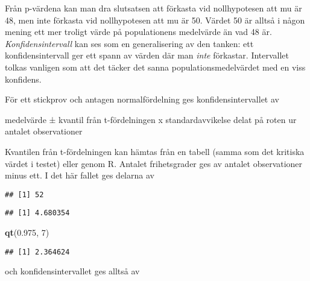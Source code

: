 \documentclass[
]{book}
\newenvironment{Shaded}{\begin{snugshade}}{\end{snugshade}}
\newcommand{\DecValTok}[1]{\textcolor[rgb]{0.00,0.00,0.81}{#1}}
\newcommand{\FloatTok}[1]{\textcolor[rgb]{0.00,0.00,0.81}{#1}}
\newcommand{\FunctionTok}[1]{\textcolor[rgb]{0.13,0.29,0.53}{\textbf{#1}}}
\newcommand{\NormalTok}[1]{#1}
\newcommand{\SpecialCharTok}[1]{\textcolor[rgb]{0.81,0.36,0.00}{\textbf{#1}}}
\theoremstyle{definition}
\theoremstyle{definition}
\theoremstyle{definition}
\theoremstyle{definition}
\theoremstyle{remark}
\begin{document}
Från p-värdena kan man dra slutsatsen att förkasta vid nollhypotesen att mu är 48, men inte förkasta vid nollhypotesen att mu är 50. Värdet 50 är alltså i någon mening ett mer troligt värde på populationens medelvärde än vad 48 är. \emph{Konfidensintervall} kan ses som en generalisering av den tanken: ett konfidensintervall ger ett spann av värden där man \emph{inte} förkastar. Intervallet tolkas vanligen som att det täcker det sanna populationsmedelvärdet med en viss konfidens.

För ett stickprov och antagen normalfördelning ges konfidensintervallet av

medelvärde ± kvantil från t-fördelningen x standardavvikelse delat på roten ur antalet observationer

Kvantilen från t-fördelningen kan hämtas från en tabell (samma som det kritiska värdet i testet) eller genom R. Antalet frihetsgrader ges av antalet observationer minus ett. I det här fallet ges delarna av

\begin{Shaded}
\end{Shaded}

\begin{verbatim}
## [1] 52
\end{verbatim}

\begin{Shaded}
\end{Shaded}

\begin{verbatim}
## [1] 4.680354
\end{verbatim}

\begin{Shaded}
\begin{Highlighting}[]
\FunctionTok{qt}\NormalTok{(}\FloatTok{0.975}\NormalTok{, }\DecValTok{7}\NormalTok{)}
\end{Highlighting}
\end{Shaded}

\begin{verbatim}
## [1] 2.364624
\end{verbatim}

och konfidensintervallet ges alltså av
\end{document}
